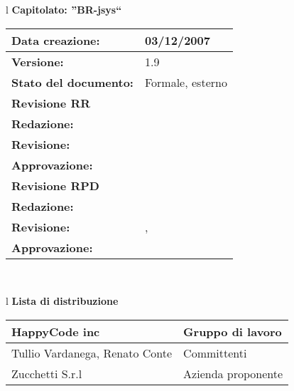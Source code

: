 

\newcommand{\lv}{ 1.9 } %
\newcommand{\dt}{ Glossario }%


\begin{center}
\thispagestyle{plain}
\begin{table}[htbp]
\large{
\begin{tabular}{l}
\Large{\textbf{\textsf{Capitolato: ''BR-jsys``}}} \\
\begin{tabular}{|p{6cm}|p{6cm}|}
\hline
\textbf{Data creazione:} & 03/12/2007 \\ \hline
\textbf{Versione:} & \lv \\ \hline
\textbf{Stato del documento:} & Formale, esterno \\ \hline
\textbf{Revisione RR} & \\ \hline
\textbf{Redazione:} & \MB \\ \hline
\textbf{Revisione:} & \MT \\ \hline
\textbf{Approvazione:}  & \ET \\ \hline
\textbf{Revisione RPD} & \\ \hline
\textbf{Redazione:} & \LA \\ \hline
\textbf{Revisione:} & \AT, \MB  \\ \hline
\textbf{Approvazione:}  & \MB \\ \hline
\end{tabular} \\
\end{tabular}
}
\end{table}

\begin{table}[hbtp]
\large{
\begin{tabular}{l}
\Large{\textbf{\textsf{Lista di distribuzione}}} \\
\begin{tabular}{|p{6cm}|p{6cm}|} \hline
{HappyCode inc}& Gruppo di lavoro \\ \hline
{Tullio Vardanega, Renato Conte}& Committenti \\ \hline 
{Zucchetti S.r.l}& Azienda proponente\\ \hline
\end{tabular} \\
\end{tabular}
}
\end{table}
\begin{table}[hbtp]


\end{table}
\end{center}
